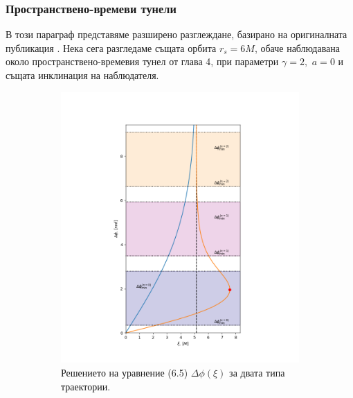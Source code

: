 \subsubsection{Пространствено-времеви тунели}
В този параграф представяме разширено разглеждане, базирано на оригиналната публикация \cite{Deliyski2022}. Нека сега разгледаме същата орбита $r_s = 6M$, обаче наблюдавана около пространствено-времевия тунел от глава 4, при параметри $\gamma = 2,\,\, a = 0$ и същата инклинация на наблюдателя.
\begin{figure}[h]
	\centering
	\begin{subfigure}{6cm}
		\centering
		\includegraphics[scale = 0.3]{WH_70_deg_r6_impact_gamma_2.png}
		\caption{Решението на уравнение (6.5) $\Delta\phi(\xi)$ за двата типа траектории.} \label{fig:1a}
	\end{subfigure}\,\,\,
	\begin{subfigure}{6cm}
		\centering

\end{subfigure}
\end{figure}
